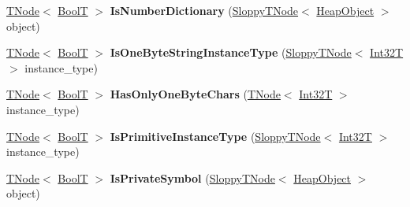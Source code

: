 \begin{DoxyCompactItemize}
\item 
\mbox{\label{classv8_1_1internal_1_1CodeStubAssembler_a0626afdc718a4c69e14425d61332eb8d}} 
\mbox{\hyperlink{classv8_1_1internal_1_1compiler_1_1TNode}{T\+Node}}$<$ \mbox{\hyperlink{structv8_1_1internal_1_1BoolT}{BoolT}} $>$ {\bfseries Is\+Number\+Dictionary} (\mbox{\hyperlink{classv8_1_1internal_1_1compiler_1_1SloppyTNode}{Sloppy\+T\+Node}}$<$ \mbox{\hyperlink{classv8_1_1internal_1_1HeapObject}{Heap\+Object}} $>$ object)
\item 
\mbox{\label{classv8_1_1internal_1_1CodeStubAssembler_ad250922addbf1c998666ac072bdae05e}} 
\mbox{\hyperlink{classv8_1_1internal_1_1compiler_1_1TNode}{T\+Node}}$<$ \mbox{\hyperlink{structv8_1_1internal_1_1BoolT}{BoolT}} $>$ {\bfseries Is\+One\+Byte\+String\+Instance\+Type} (\mbox{\hyperlink{classv8_1_1internal_1_1compiler_1_1SloppyTNode}{Sloppy\+T\+Node}}$<$ \mbox{\hyperlink{structv8_1_1internal_1_1Int32T}{Int32T}} $>$ instance\+\_\+type)
\item 
\mbox{\label{classv8_1_1internal_1_1CodeStubAssembler_a3f96b79c42b7b817b02bf0bc3d15f5d6}} 
\mbox{\hyperlink{classv8_1_1internal_1_1compiler_1_1TNode}{T\+Node}}$<$ \mbox{\hyperlink{structv8_1_1internal_1_1BoolT}{BoolT}} $>$ {\bfseries Has\+Only\+One\+Byte\+Chars} (\mbox{\hyperlink{classv8_1_1internal_1_1compiler_1_1TNode}{T\+Node}}$<$ \mbox{\hyperlink{structv8_1_1internal_1_1Int32T}{Int32T}} $>$ instance\+\_\+type)
\item 
\mbox{\label{classv8_1_1internal_1_1CodeStubAssembler_af3a538d4c8b96db18d8c943f61cb0918}} 
\mbox{\hyperlink{classv8_1_1internal_1_1compiler_1_1TNode}{T\+Node}}$<$ \mbox{\hyperlink{structv8_1_1internal_1_1BoolT}{BoolT}} $>$ {\bfseries Is\+Primitive\+Instance\+Type} (\mbox{\hyperlink{classv8_1_1internal_1_1compiler_1_1SloppyTNode}{Sloppy\+T\+Node}}$<$ \mbox{\hyperlink{structv8_1_1internal_1_1Int32T}{Int32T}} $>$ instance\+\_\+type)
\item 
\mbox{\label{classv8_1_1internal_1_1CodeStubAssembler_a4ea73fa528cb8a064e8843cc51e74f69}} 
\mbox{\hyperlink{classv8_1_1internal_1_1compiler_1_1TNode}{T\+Node}}$<$ \mbox{\hyperlink{structv8_1_1internal_1_1BoolT}{BoolT}} $>$ {\bfseries Is\+Private\+Symbol} (\mbox{\hyperlink{classv8_1_1internal_1_1compiler_1_1SloppyTNode}{Sloppy\+T\+Node}}$<$ \mbox{\hyperlink{classv8_1_1internal_1_1HeapObject}{Heap\+Object}} $>$ object)

\end{DoxyCompactItemize}
